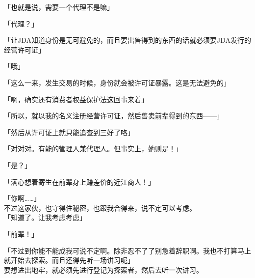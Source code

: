「也就是说，需要一个代理不是嘛」

「代理？」

「让JDA知道身份是无可避免的，而且要出售得到的东西的话就必须要JDA发行的经营许可证」

「哦」

「这么一来，发生交易的时候，身份就会被许可证暴露。这是无法避免的」

「啊，确实还有消费者权益保护法这回事来着」

「所以，就以我的名义注册经营许可证，然后售卖前辈得到的东西——」

「然后从许可证上就只能追查到三好了咯」

「对对对。有能的管理人兼代理人。但事实上，她则是！」

「是？」

「满心想着寄生在前辈身上赚差价的近江商人！」

「你啊……」\\

不过这家伙，也守得住秘密，也跟我合得来，说不定可以考虑。\\

「知道了。让我考虑考虑」

「前辈！」

「不过到你能不能成我可说不定啊。除非忍不了了别急着辞职啊。我也不打算马上就开始去探索。而且还得先听一场讲习呢」\\

要想进出地牢，就必须先进行登记为探索者，然后去听一次讲习。

